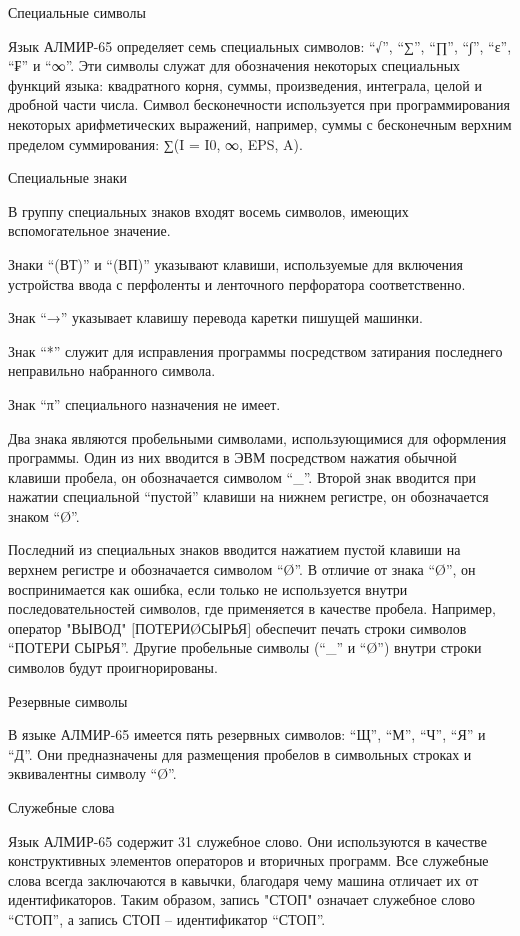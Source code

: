 \documentclass[11pt]{article}
\begin{document}
Специальные символы

Язык АЛМИР-65 определяет семь
специальных символов: “√”, “∑”,
“∏”, “∫”, “ε”,  “₣” и “∞”. Эти
символы служат для обозначения
некоторых специальных функций языка:
квадратного корня, суммы, произведения,
интеграла, целой и дробной части числа.
Символ бесконечности используется при
программирования некоторых
арифметических выражений, например,
суммы с бесконечным верхним пределом
суммирования: ∑(I = I0, ∞, EPS, A).

Специальные знаки

В группу специальных знаков входят
восемь символов, имеющих
вспомогательное значение.

Знаки “(ВТ)” и “(ВП)” указывают
клавиши, используемые для включения
устройства ввода с перфоленты и
ленточного перфоратора
соответственно.

Знак “→” указывает клавишу перевода
каретки пишущей машинки.

Знак “*” служит для исправления
программы посредством затирания
последнего неправильно набранного
символа.

Знак “π” специального назначения не
имеет.

Два знака являются пробельными
символами, использующимися для
оформления программы. Один из них
вводится в ЭВМ посредством нажатия
обычной клавиши пробела, он
обозначается символом “\_”. Второй
знак вводится при нажатии специальной
“пустой” клавиши на нижнем регистре,
он обозначается знаком “Ø”.

Последний из специальных знаков
вводится нажатием пустой клавиши на
верхнем регистре и обозначается
символом “Ø”. В отличие от знака “Ø”,
он воспринимается как ошибка, если
только не используется внутри
последовательностей символов, где
применяется в качестве пробела.
Например, оператор "ВЫВОД"
$[$ПОТЕРИØСЫРЬЯ$]$ обеспечит печать
строки символов “ПОТЕРИ СЫРЬЯ”.
Другие пробельные символы (“\_” и “Ø”)
внутри строки символов будут
проигнорированы.

Резервные символы

В языке АЛМИР-65 имеется пять резервных
символов: “Щ”, “М”, “Ч”, “Я” и “Д”.
Они предназначены для размещения
пробелов в символьных строках и
эквивалентны символу “Ø”.

Служебные слова

Язык АЛМИР-65 содержит 31 служебное
слово. Они используются в качестве
конструктивных элементов операторов и
вторичных программ. Все служебные
слова всегда заключаются в кавычки,
благодаря чему машина отличает их от
идентификаторов. Таким образом, запись
"СТОП" означает служебное слово
“СТОП”, а запись СТОП – идентификатор
“СТОП”.
\end{document}
